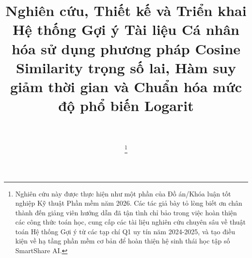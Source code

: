 \documentclass[journal]{IEEEtran}
\begin{document}
\title{Nghiên cứu, Thiết kế và Triển khai Hệ thống Gợi ý Tài liệu Cá nhân hóa sử dụng phương pháp Cosine Similarity trọng số lai, Hàm suy giảm thời gian và Chuẩn hóa mức độ phổ biến Logarit}

\author{
     \\
    
    \thanks{Nghiên cứu này được thực hiện như một phần của Đồ án/Khóa luận tốt nghiệp Kỹ thuật Phần mềm năm 2026. 
    Các tác giả bày tỏ lòng biết ơn chân thành đến giảng viên hướng dẫn đã tận tình chỉ bảo trong việc hoàn thiện các công thức toán học, 
    cung cấp các tài liệu nghiên cứu chuyên sâu về thuật toán Hệ thống Gợi ý từ các tạp chí Q1 uy tín năm 2024-2025, 
    và tạo điều kiện về hạ tầng phần mềm cơ bản để hoàn thiện hệ sinh thái học tập số SmartShare AI.}
}

\maketitle
\end{document}
